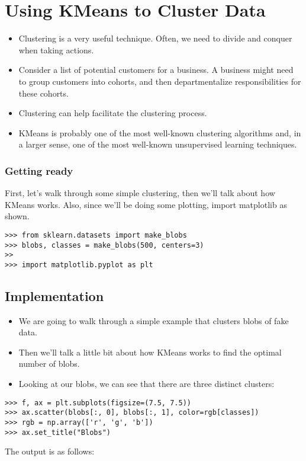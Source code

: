 \documentclass[SKL-MASTER.tex]{subfiles}
\begin{document}
	\Large
\section*{Using KMeans to Cluster Data}
\begin{itemize}
\item Clustering is a very useful technique. Often, we need to divide and conquer when taking
actions. 
\item Consider a list of potential customers for a business. A business might need to
group customers into cohorts, and then departmentalize responsibilities for these cohorts.
\item Clustering can help facilitate the clustering process.
\item KMeans is probably one of the most well-known clustering algorithms and, in a larger sense,
one of the most well-known unsupervised learning techniques.
\end{itemize}

\subsubsection*{Getting ready}
First, let's walk through some simple clustering, then we'll talk about how KMeans works.
Also, since we'll be doing some plotting, import matplotlib as shown.

\begin{framed}
	\begin{verbatim}
>>> from sklearn.datasets import make_blobs
>>> blobs, classes = make_blobs(500, centers=3)
>>
>>> import matplotlib.pyplot as plt
\end{verbatim}
\end{framed}
\subsection*{Implementation} %
\begin{itemize}
\item We are going to walk through a simple example that clusters blobs of fake data. 
\item Then we'll talk
a little bit about how KMeans works to find the optimal number of blobs.
\item Looking at our blobs, we can see that there are three distinct clusters:

\end{itemize}


\begin{framed}
	\begin{verbatim}
>>> f, ax = plt.subplots(figsize=(7.5, 7.5))
>>> ax.scatter(blobs[:, 0], blobs[:, 1], color=rgb[classes])
>>> rgb = np.array(['r', 'g', 'b'])
>>> ax.set_title("Blobs")
\end{verbatim}
\end{framed}
The output is as follows:
\end{document}
